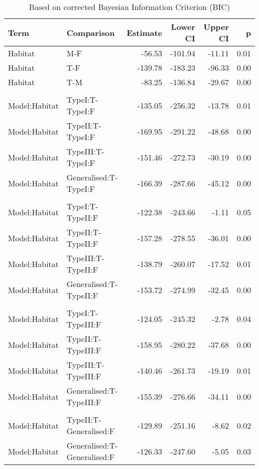 \documentclass[11pt]{article}
\begin{document}
\begin{table}[ht]
\begin{subtable}{1\textwidth}
    \centering
        \caption{Based on corrected Bayesian Information Criterion (BIC)}\label{tab:sub_first}
\begin{tabular}{llrrrr}
    \toprule
   {\textbf{Term}} & {\textbf{Comparison}} & {\textbf{Estimate}} & {\textbf{Lower CI}} & {\textbf{Upper CI}} & {\textbf{p}} \\ 
    \midrule
  Habitat & M-F & -56.53 & -101.94 & -11.11 & 0.01 \\ 
  Habitat & T-F & -139.78 & -183.23 & -96.33 & 0.00 \\ 
  Habitat & T-M & -83.25 & -136.84 & -29.67 & 0.00 \\ 
  \\
  Model:Habitat & TypeI:T-TypeI:F & -135.05 & -256.32 & -13.78 & 0.01 \\ 
  Model:Habitat & TypeII:T-TypeI:F & -169.95 & -291.22 & -48.68 & 0.00 \\ 
  Model:Habitat & TypeIII:T-TypeI:F & -151.46 & -272.73 & -30.19 & 0.00 \\ 
  Model:Habitat & Generalised:T-TypeI:F & -166.39 & -287.66 & -45.12 & 0.00 \\ 
  \\
  Model:Habitat & TypeI:T-TypeII:F & -122.38 & -243.66 & -1.11 & 0.05 \\ 
  Model:Habitat & TypeII:T-TypeII:F & -157.28 & -278.55 & -36.01 & 0.00 \\ 
  Model:Habitat & TypeIII:T-TypeII:F & -138.79 & -260.07 & -17.52 & 0.01 \\ 
  Model:Habitat & Generalised:T-TypeII:F & -153.72 & -274.99 & -32.45 & 0.00 \\ 
  \\
  Model:Habitat & TypeI:T-TypeIII:F & -124.05 & -245.32 & -2.78 & 0.04 \\ 
  Model:Habitat & TypeII:T-TypeIII:F & -158.95 & -280.22 & -37.68 & 0.00 \\ 
  Model:Habitat & TypeIII:T-TypeIII:F & -140.46 & -261.73 & -19.19 & 0.01 \\ 
  Model:Habitat & Generalised:T-TypeIII:F & -155.39 & -276.66 & -34.11 & 0.00 \\ 
  \\
  Model:Habitat & TypeII:T-Generalised:F & -129.89 & -251.16 & -8.62 & 0.02 \\ 
  Model:Habitat & Generalised:T-Generalised:F & -126.33 & -247.60 & -5.05 & 0.03 \\ 
     \bottomrule
  \end{tabular}
\end{subtable}

\end{table}
\end{document}
